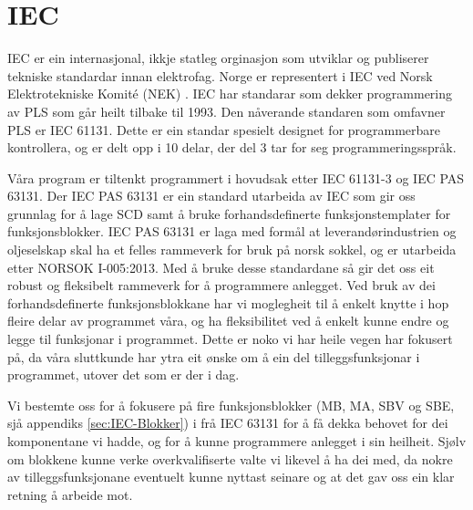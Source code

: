 \section{IEC}
\thispagestyle{fancy}
\label{sec:5.2}


\gls{IEC} \citep{IEC} er ein internasjonal, ikkje statleg orginasjon som utviklar og publiserer tekniske standardar innan elektrofag. 
Norge er representert i IEC ved Norsk Elektrotekniske Komité (NEK) \citep{IEC-SNL}. 
IEC har standarar som dekker programmering av PLS som går heilt tilbake til 1993\citep{Wiki-93}. 
Den nåverande standaren som omfavner PLS er IEC 61131\citep{IEC-61131}. Dette er ein standar spesielt designet for programmerbare kontrollera, og er delt opp i 10 delar, der del 3 tar for seg programmeringsspråk. 

Våra program er tiltenkt programmert i hovudsak etter IEC 61131-3 og IEC \gls{PAS} 63131\citep{IEC-63131}. 
Der IEC PAS 63131 er ein standard utarbeida av IEC som gir oss grunnlag for å lage \gls{SCD} samt å bruke forhandsdefinerte funksjonstemplater for funksjonsblokker. 
IEC PAS 63131 er laga med formål at leverandørindustrien og oljeselskap skal ha et felles rammeverk for bruk på norsk sokkel, og er utarbeida etter NORSOK I-005:2013.
Med å bruke desse standardane så gir det oss eit robust og fleksibelt rammeverk for å programmere anlegget. 
Ved bruk av dei forhandsdefinerte funksjonsblokkane har vi moglegheit til å enkelt knytte i hop fleire delar av programmet våra, og ha fleksibilitet ved å enkelt kunne endre og legge til funksjonar i programmet. 
Dette er noko vi har heile vegen har fokusert på, da våra sluttkunde har ytra eit ønske om å ein del tilleggsfunksjonar i programmet, utover det som er der i dag. 

Vi bestemte oss for å fokusere på fire funksjonsblokker (MB, MA, SBV og SBE, sjå appendiks \ref{sec:IEC-Blokker})  
i frå IEC 63131 for å få dekka behovet for dei komponentane vi hadde, og for å kunne programmere anlegget i sin heilheit.
Sjølv om blokkene kunne verke overkvalifiserte valte vi likevel å ha dei med, da nokre av tilleggsfunksjonane eventuelt kunne nyttast seinare
og at det gav oss ein klar retning å arbeide mot.
\newpage
